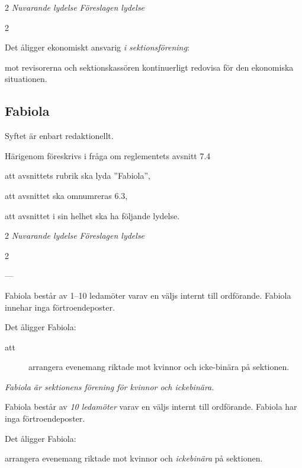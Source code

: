 \documentclass{article}
\newenvironment{lydelse}
    {\begin{paracol}{2}%
        \emph{Nuvarande lydelse}%
        \switchcolumn%
        \emph{Föreslagen lydelse}%
    \end{paracol}%
    \begin{enumerate}[label=\thesubsection.\arabic*]%
    \begin{paracol}{2}%
    }{\end{paracol}\end{enumerate}}
\begin{document}
\begin{lydelse}
    \item Det åligger ekonomiskt ansvarig \emph{i sektionsförening}:
    \label{R:SektForeningEkonomi}
    \begin{aligganden}
        \item mot revisorerna och sektionskassören kontinuerligt redovisa för den ekonomiska situationen.
    \end{aligganden}
    
\end{lydelse}
\subsection{Fabiola}
Syftet är enbart redaktionellt.

Härigenom föreskrivs i fråga om reglementets avsnitt 7.4

\begin{dels}
    \item att avsnittets rubrik ska lyda ''Fabiola'',
    \item att avsnittet ska omnumreras 6.3,
    \item att avsnittet i sin helhet ska ha följande lydelse.
\end{dels}

\begin{lydelse}

    \setcounter{section}{7}
    \setcounter{subsection}{4}

    \item[] ---\vspace{1.2em}
    
    \item Fabiola består av 1--10 ledamöter varav en väljs internt till ordförande. Fabiola innehar inga förtroendeposter.
    
	\item Det åligger Fabiola:
	\begin{description}
		\item[att] arrangera evenemang riktade mot kvinnor och icke-binära på sektionen.
	\end{description}   %
    
    \setcounter{section}{6}
    \setcounter{subsection}{3}
    
    \switchcolumn
    
    \item \emph{Fabiola är sektionens förening för kvinnor och ickebinära.}

    \item Fabiola består av \emph{10 ledamöter} varav en väljs internt till ordförande. Fabiola har inga förtroendeposter.
    		
    \item Det åligger Fabiola:
    \begin{aligganden}
        \item arrangera evenemang riktade mot kvinnor och \emph{ickebinära} på sektionen.
    \end{aligganden}   %
    
\end{lydelse}
\end{document}

